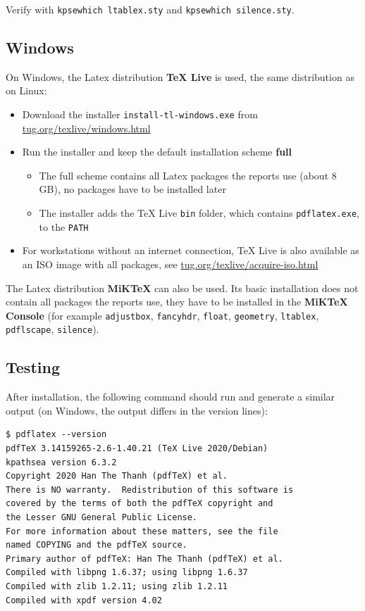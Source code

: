 Verify with \texttt{kpsewhich ltablex.sty} and \texttt{kpsewhich silence.sty}.

\subsection{Windows}
\label{sec:appendix_latex_windows}

On Windows, the Latex distribution \textbf{TeX Live} is used, the same distribution as on Linux:
\begin{itemize}
    \item Download the installer \texttt{install-tl-windows.exe} from \href{https://tug.org/texlive/windows.html}{tug.org/texlive/windows.html}
    \item Run the installer and keep the default installation scheme \textbf{full}
    \begin{itemize}
        \item The full scheme contains all Latex packages the reports use (about 8 GB), no packages have to be installed later
        \item The installer adds the TeX Live \texttt{bin} folder, which contains \texttt{pdflatex.exe}, to the \texttt{PATH}
    \end{itemize}
    \item For workstations without an internet connection, TeX Live is also available as an ISO image with all packages, see \href{https://tug.org/texlive/acquire-iso.html}{tug.org/texlive/acquire-iso.html}
\end{itemize}

The Latex distribution \textbf{MiKTeX} can also be used. Its basic installation does not contain all packages the reports use, they have to be installed in the \textbf{MiKTeX Console} (for example \texttt{adjustbox}, \texttt{fancyhdr}, \texttt{float}, \texttt{geometry}, \texttt{ltablex}, \texttt{pdflscape}, \texttt{silence}). \\

\subsection{Testing}

After installation, the following command should run and generate a similar output (on Windows, the output differs in the version lines):

\begin{lstlisting}
$ pdflatex --version
pdfTeX 3.14159265-2.6-1.40.21 (TeX Live 2020/Debian)
kpathsea version 6.3.2
Copyright 2020 Han The Thanh (pdfTeX) et al.
There is NO warranty.  Redistribution of this software is
covered by the terms of both the pdfTeX copyright and
the Lesser GNU General Public License.
For more information about these matters, see the file
named COPYING and the pdfTeX source.
Primary author of pdfTeX: Han The Thanh (pdfTeX) et al.
Compiled with libpng 1.6.37; using libpng 1.6.37
Compiled with zlib 1.2.11; using zlib 1.2.11
Compiled with xpdf version 4.02
\end{lstlisting}

